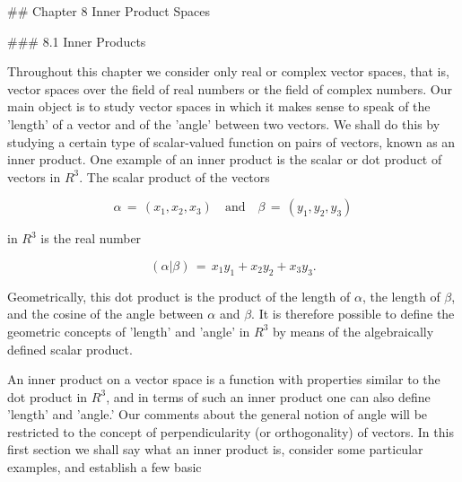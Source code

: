 

## Chapter 8 Inner Product Spaces

### 8.1 Inner Products

Throughout this chapter we consider only real or complex vector spaces, that is, vector spaces over the field of real numbers or the field of complex numbers. Our main object is to study vector spaces in which it makes sense to speak of the 'length' of a vector and of the 'angle' between two vectors. We shall do this by studying a certain type of scalar-valued function on pairs of vectors, known as an inner product. One example of an inner product is the scalar or dot product of vectors in \(R^{3}\). The scalar product of the vectors

\[\alpha\,=\,(x_{1},x_{2},x_{3})\quad\text{and}\quad\beta\,=\,(y_{1},y_{2},y_{3})\]

in \(R^{3}\) is the real number

\[(\alpha|\beta)\,=\,x_{1}y_{1}+x_{2}y_{2}+x_{3}y_{3}.\]

Geometrically, this dot product is the product of the length of \(\alpha\), the length of \(\beta\), and the cosine of the angle between \(\alpha\) and \(\beta\). It is therefore possible to define the geometric concepts of 'length' and 'angle' in \(R^{3}\) by means of the algebraically defined scalar product.

An inner product on a vector space is a function with properties similar to the dot product in \(R^{3}\), and in terms of such an inner product one can also define 'length' and 'angle.' Our comments about the general notion of angle will be restricted to the concept of perpendicularity (or orthogonality) of vectors. In this first section we shall say what an inner product is, consider some particular examples, and establish a few basic